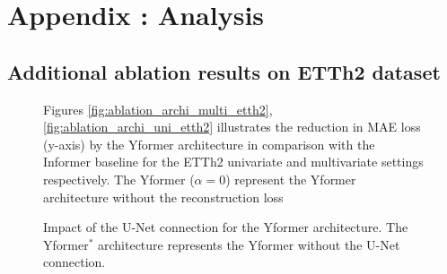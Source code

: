 \section{Appendix : Analysis}

\subsection{Additional ablation results on ETTh2 dataset}
\label{appendix:ablation_etth2}

\begin{figure}[!ht]
    \centering
\caption{Figures \ref{fig:ablation_archi_multi_etth2}, \ref{fig:ablation_archi_uni_etth2} illustrates the reduction in MAE loss (y-axis) by  the Yformer architecture in comparison with the Informer baseline for the ETTh2 univariate and multivariate settings respectively. The Yformer ($\alpha=0$) represent the Yformer architecture without the reconstruction loss
}
\label{fig:archi_abltation_etth2}
\end{figure}


\begin{figure}[!ht]
    \centering
\caption{Impact of the U-Net connection for the Yformer architecture. The Yformer$^*$ architecture represents the Yformer without the U-Net connection.}
\label{fig:skipless_ablation_2}
\end{figure}


